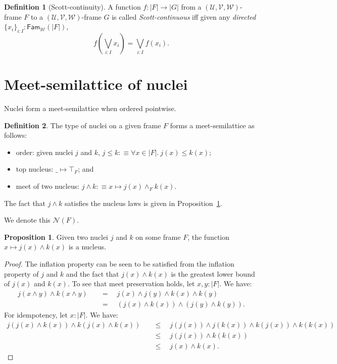 \documentclass[a4paper, 11pt]{article}
\theoremstyle{definition}
\newtheorem{prop}{Proposition}
\newtheorem{defn}{Definition}
\newcommand{\UU}{\mathcal{U}}
\newcommand{\VV}{\mathcal{V}}
\newcommand{\WW}{\mathcal{W}}
\newcommand{\Fam}[2]{\mathsf{Fam}_{#1}\left(#2\right)}
\newcommand{\define}[1]{\emph{#1}}
\begin{document}
\begin{defn}[Scott-continuity]
  A function $f : | F | \rightarrow | G | $ from a $(\UU, \VV, \WW)$-frame $F$ to a $(\UU, \VV, \WW)$-frame
  $G$ is called \define{Scott-continuous} iff given any \emph{directed}
  $\{ x_i \}_{i : I} : \Fam{\WW}{| F |}$,
  \begin{equation*}
    f\left(\bigvee_{i : I} x_i\right) = \bigvee_{i : I} f(x_i).
  \end{equation*}
\end{defn}

\section{Meet-semilattice of nuclei}

Nuclei form a meet-semilattice when ordered pointwise.

\begin{defn}\label{defn:nuclei-semilattice}
  The type of nuclei on a given frame $F$ forms a meet-semilattice as follows:
  \begin{itemize}
    \item order: given nuclei $j$ and $k$, $j \le k :\equiv \forall x \in | F |.\ j(x) \le k(x)$;
    \item top nucleus: $\_ \mapsto \top_F$; and
    \item meet of two nucleus: $j \wedge k :\equiv x \mapsto j(x) \wedge_F k(x)$.
  \end{itemize}
  The fact that $j \wedge k$ satisfies the nucleus laws is given in Proposition~\ref{prop:nuclei-meet}.
\end{defn}

We denote this $\mathcal{N}(F)$.

\begin{prop}\label{prop:nuclei-meet}
  Given two nuclei $j$ and $k$ on some frame $F$, the function $x \mapsto j(x) \wedge k(x)$ is a nucleus.
\end{prop}
\begin{proof}
  The inflation property can be seen to be satisfied from the inflation property of $j$ and $k$ and
  the fact that $j(x) \wedge k(x)$ is the greatest lower bound of $j(x)$ and $k(x)$. To see that meet
  preservation holds, let $x, y : | F |$. We have:
  \begin{align*}
    j (x \wedge y) \wedge k (x \wedge y) &\quad=\quad j(x) \wedge j(y) \wedge k(x) \wedge k(y) \\
                          &\quad=\quad (j(x) \wedge k(x)) \wedge (j(y) \wedge k(y)).
  \end{align*}
  For idempotency, let $x : | F |$. We have:
  \begin{align*}
    j (j(x) \wedge k(x)) \wedge k(j(x) \wedge k(x)) &\quad\le\quad j(j(x)) \wedge j(k(x)) \wedge k(j(x)) \wedge k(k(x)) \\
                                     &\quad\le\quad j(j(x)) \wedge k(k(x)) & \\
                                     &\quad\le\quad j(x) \wedge k(x).
  \end{align*}
\end{proof}
\end{document}
